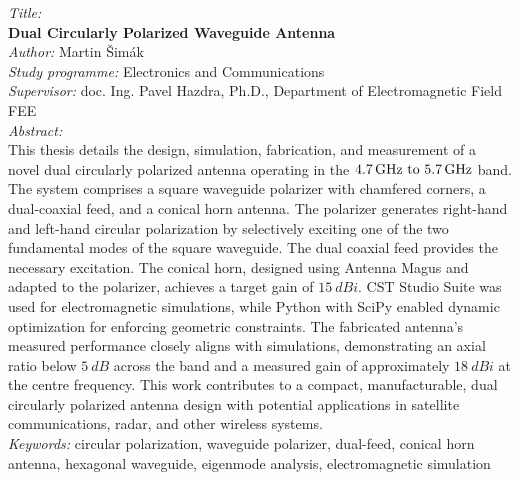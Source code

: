 \clearpage
\noindent\textit{Title:}\\
\textbf{Dual Circularly Polarized Waveguide Antenna}\\[0.25cm]
\textit{Author:} Martin Šimák\\[0.25cm]
\textit{Study programme:} Electronics and Communications\\[0.25cm]
\textit{Supervisor:} doc. Ing. Pavel Hazdra, Ph.D., Department of Electromagnetic Field FEE\\[0.25cm]
\textit{Abstract:}\\
This thesis details the design, simulation, fabrication, and measurement of a novel dual circularly polarized antenna operating in the $\frequencyrange$ band. The system comprises a square waveguide polarizer with chamfered corners, a dual-coaxial feed, and a conical horn antenna. The polarizer generates right-hand and left-hand circular polarization by selectively exciting one of the two fundamental modes of the square waveguide. The dual coaxial feed provides the necessary excitation. The conical horn, designed using Antenna Magus and adapted to the polarizer, achieves a target gain of $\qty{15}{dBi}$. CST Studio Suite was used for electromagnetic simulations, while Python with SciPy enabled dynamic optimization for enforcing geometric constraints. The fabricated antenna's measured performance closely aligns with simulations, demonstrating an axial ratio below $\qty{5}{dB}$ across the band and a measured gain of approximately $\qty{18}{dBi}$ at the centre frequency. This work contributes to a compact, manufacturable, dual circularly polarized antenna design with potential applications in satellite communications, radar, and other wireless systems.\\[0.25cm]
\textit{Keywords:} circular polarization, waveguide polarizer, dual-feed, conical horn antenna, hexagonal waveguide, eigenmode analysis, electromagnetic simulation\\[0.5cm]
